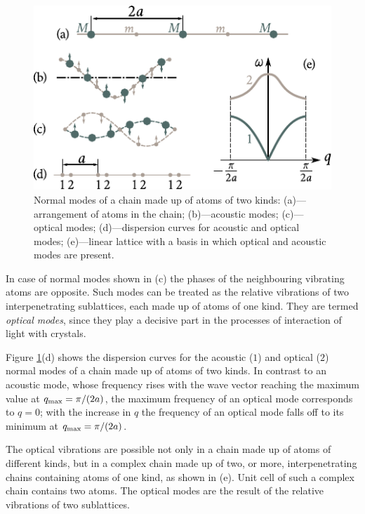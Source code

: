 \begin{figure}[t]
	\begin{center}
		\includegraphics[scale=1.1]{figures/ch_04/fig_4_2.pdf}
		\caption[]{Normal modes of a chain made up of atoms of two kinds: (a)---arrangement of atoms in the chain; (b)---acoustic modes; (c)---optical modes; (d)---dispersion curves for acoustic and optical modes; (e)---linear lattice with a basis in which optical and acoustic modes are present.}
		\label{fig:4_2}
	\end{center}
	\vspace{-0.7cm}
\end{figure}

In case of normal modes shown in (c) the phases of the neighbouring vibrating atoms are opposite. Such modes can be treated as the relative vibrations of two interpenetrating sublattices, each made up of atoms of one kind. They are termed \textit{optical modes}, since they play a decisive part in the processes of interaction of light with crystals.

Figure \ref{fig:4_2}(d) shows the dispersion curves for the acoustic ($1$) and optical ($2$) normal modes of a chain made up of atoms of two kinds. In contrast to an acoustic mode, whose frequency rises with the wave vector reaching the maximum value at $q_{\text{max}}=\pi/(2a)$, the maximum frequency of an optical mode corresponds to $q=0$; with the increase in $q$ the frequency of an optical mode falls off to its minimum at $q_{\text{max}}=\pi/(2a)$.

The optical vibrations are possible not only in a chain made up of atoms of different kinds, but in a complex chain made up of two, or more, interpenetrating chains containing atoms of one kind, as shown in (e). Unit cell of such a complex chain contains two atoms. The optical modes are the result of the relative vibrations of two sublattices.

